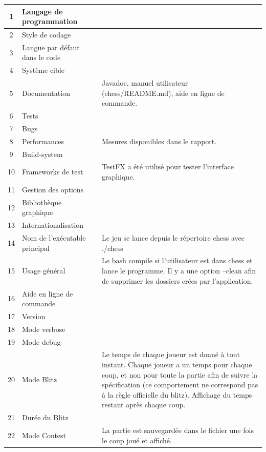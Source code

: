 \documentclass{article}
\newcommand{\valid}{\textcolor{green}{\ding{108}}}  %
\begin{document}
\begin{longtable}{|c|p{5cm}|c|p{5cm}|}
    \hline
    1 & Langage de programmation & \valid & \\
    \hline
    2 & Style de codage & \valid & \\
    \hline
    3 & Langue par défaut dans le code & \valid & \\
    \hline
    4 & Système cible & \valid & \\
    \hline
    5 & Documentation & \valid & Javadoc, manuel utilisateur (chess/README.md), aide en ligne de commande. \\
    \hline
    6 & Tests & \valid & \\
    \hline
    7 & Bugs & \valid & \\
    \hline
    8 & Performances & \valid & Mesures disponibles dans le rapport. \\
    \hline
    9 & Build-system & \valid & \\
    \hline
    10 & Frameworks de test & \valid & TestFX a été utilisé pour tester l'interface graphique. \\
    \hline
    11 & Gestion des options & \valid & \\
    \hline
    12 & Bibliothèque graphique & \valid & \\
    \hline
    13 & Internationalisation & \valid & \\
    \hline
    14 & Nom de l’exécutable principal & \valid & Le jeu se lance depuis le répertoire chess avec ./chess\\
    \hline
    15 & Usage général & \valid & Le bash compile si l'utilisateur est dans chess et lance le programme. Il y a une option --clean afin de supprimer les dossiers crées par l'application. \\
    \hline
    16 & Aide en ligne de commande & \valid & \\
    \hline
    17 & Version & \valid & \\
    \hline
    18 & Mode verbose & \valid & \\
    \hline
    19 & Mode debug & \valid & \\
    \hline
    20 & Mode Blitz & \valid & Le temps de chaque joueur est donné à tout instant. Chaque joueur a un temps pour chaque coup, et non pour toute la partie afin de suivre la spécification (ce comportement ne correspond pas à la règle officielle du blitz). Affichage du temps restant après chaque coup.\\
    \hline
    21 & Durée du Blitz & \valid & \\
    \hline
    22 & Mode Contest & \valid & La partie est sauvegardée dans le fichier une fois le coup joué et affiché.\\

\end{longtable}
\end{document}
